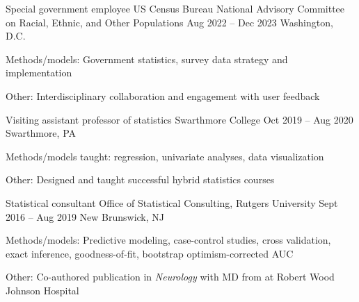 \documentclass[letterpaper]{resume_config}
\begin{document}
\WorkExperience
    {Special government employee}  
    {US Census Bureau National Advisory Committee on Racial, Ethnic, and Other Populations}  
    {Aug 2022 -- Dec 2023}  
    {Washington, D.C.}  
    {
        \item Methods/models: Government statistics, survey data strategy and implementation
        \item Other:  Interdisciplinary collaboration and engagement with user feedback 
    } 


\WorkExperience
    {Visiting assistant professor of statistics}  
    {Swarthmore College}  
    {Oct 2019 -- Aug 2020}  
    {Swarthmore, PA}  
    {
        \item Methods/models taught: regression, univariate analyses, data visualization  
        \item Other: Designed and taught successful hybrid statistics courses 
        } 


\WorkExperience
    {Statistical consultant}  
    {Office of Statistical Consulting, Rutgers University} 
    {Sept 2016 -- Aug 2019} 
    {New Brunswick, NJ}  
    {
        \item Methods/models: Predictive modeling, case-control studies, cross validation, exact inference, goodness-of-fit, bootstrap optimism-corrected AUC  
        \item Other: Co-authored publication in {\it Neurology} with MD from at Robert Wood Johnson Hospital
    } 


\end{document}
